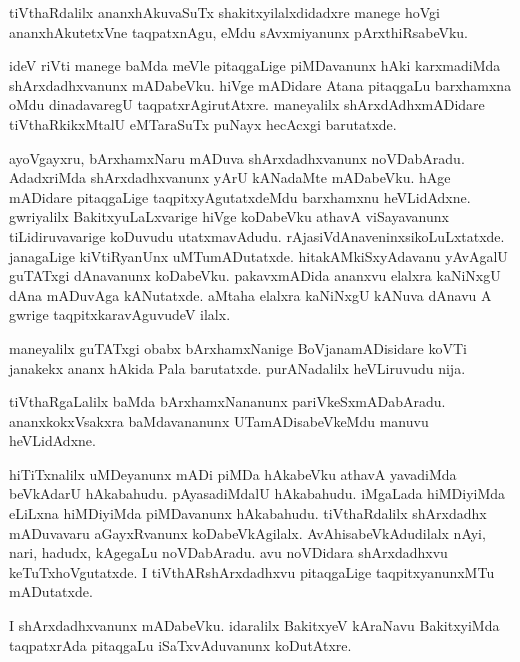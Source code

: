 \begin{mng}
tiVthaRdalilx ananxhAkuvaSuTx shakitxyilalxdidadxre manege hoVgi ananxhAkutetxVne taqpatxnAgu, eMdu sAvxmiyanunx pArxthiRsabeVku.
\end{mng}

\begin{mng}
ideV riVti manege baMda meVle pitaqgaLige piMDavanunx hAki karxmadiMda shArxdadhxvanunx mADabeVku. hiVge mADidare Atana pitaqgaLu barxhamxna oMdu dinadavaregU taqpatxrAgirutAtxre. maneyalilx shArxdAdhxmADidare tiVthaRkikxMtalU eMTaraSuTx puNayx hecAcxgi barutatxde. 
\end{mng}

\begin{mng}
ayoVgayxru, bArxhamxNaru mADuva shArxdadhxvanunx noVDabAradu. AdadxriMda shArxdadhxvanunx yArU kANadaMte mADabeVku. hAge mADidare pitaqgaLige taqpitxyAgutatxdeMdu barxhamxnu heVLidAdxne. gwriyalilx BakitxyuLaLxvarige hiVge koDabeVku athavA viSayavanunx tiLidiruvavarige koDuvudu utatxmavAdudu. rAjasiVdAnaveninxsikoLuLxtatxde. janagaLige kiVtiRyanUnx uMTumADutatxde. hitakAMkiSxyAdavanu yAvAgalU guTATxgi dAnavanunx koDabeVku. pakavxmADida ananxvu elalxra kaNiNxgU dAna mADuvAga kANutatxde. aMtaha elalxra kaNiNxgU kANuva dAnavu A gwrige taqpitxkaravAguvudeV ilalx.
\end{mng}

\begin{mng}
maneyalilx guTATxgi obabx bArxhamxNanige BoVjanamADisidare koVTi janakekx ananx hAkida Pala barutatxde. purANadalilx heVLiruvudu nija.
\end{mng}

\begin{mng}
tiVthaRgaLalilx baMda bArxhamxNananunx pariVkeSxmADabAradu. ananxkokxVsakxra baMdavananunx UTamADisabeVkeMdu manuvu heVLidAdxne.
\end{mng}

\begin{mng}
hiTiTxnalilx uMDeyanunx mADi piMDa hAkabeVku athavA yavadiMda beVkAdarU hAkabahudu. pAyasadiMdalU hAkabahudu. iMgaLada hiMDiyiMda eLiLxna hiMDiyiMda piMDavanunx hAkabahudu. tiVthaRdalilx shArxdadhx mADuvavaru aGayxRvanunx koDabeVkAgilalx. AvAhisabeVkAdudilalx nAyi, nari, hadudx, kAgegaLu noVDabAradu. avu noVDidara shArxdadhxvu keTuTxhoVgutatxde. I tiVthARshArxdadhxvu pitaqgaLige taqpitxyanunxMTu mADutatxde.
\end{mng}

\begin{mng}
I shArxdadhxvanunx mADabeVku. idaralilx BakitxyeV kAraNavu BakitxyiMda taqpatxrAda pitaqgaLu iSaTxvAduvanunx koDutAtxre.
\end{mng}

